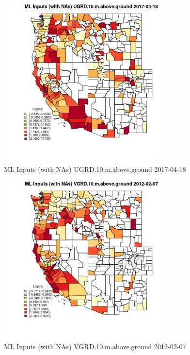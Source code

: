 \begin{figure} 
\centering  
\includegraphics[width=0.77\textwidth]{Code_Outputs/Report_ML_input_PM25_Step4_part_f_de_duplicated_aves_prioritize_24hr_obswNAs_CountyUGRD10mabovegroundMean2017-04-18.jpg} 
\caption{\label{fig:Report_ML_input_PM25_Step4_part_f_de_duplicated_aves_prioritize_24hr_obswNAsCountyUGRD10mabovegroundMean2017-04-18}ML Inputs (with NAs) UGRD.10.m.above.ground 2017-04-18} 
\end{figure} 
 

\clearpage 

\begin{figure} 
\centering  
\includegraphics[width=0.77\textwidth]{Code_Outputs/Report_ML_input_PM25_Step4_part_f_de_duplicated_aves_prioritize_24hr_obswNAs_CountyVGRD10mabovegroundMean2012-02-07.jpg} 
\caption{\label{fig:Report_ML_input_PM25_Step4_part_f_de_duplicated_aves_prioritize_24hr_obswNAsCountyVGRD10mabovegroundMean2012-02-07}ML Inputs (with NAs) VGRD.10.m.above.ground 2012-02-07} 
\end{figure} 
 

